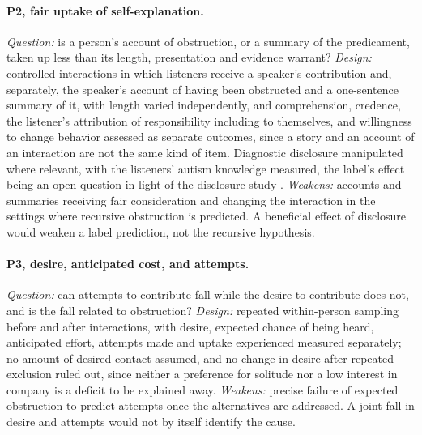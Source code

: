 \paragraph{P2, fair uptake of self-explanation.} \emph{Question:} is a person's account of obstruction, or a summary of the predicament, taken up less than its length, presentation and evidence warrant? \emph{Design:} controlled interactions in which listeners receive a speaker's contribution and, separately, the speaker's account of having been obstructed and a one-sentence summary of it, with length varied independently, and comprehension, credence, the listener's attribution of responsibility including to themselves, and willingness to change behavior assessed as separate outcomes, since a story and an account of an interaction are not the same kind of item. Diagnostic disclosure manipulated where relevant, with the listeners' autism knowledge measured, the label's effect being an open question in light of the disclosure study \cite{SassonMorrison2019}. \emph{Weakens:} accounts and summaries receiving fair consideration and changing the interaction in the settings where recursive obstruction is predicted. A beneficial effect of disclosure would weaken a label prediction, not the recursive hypothesis.

\paragraph{P3, desire, anticipated cost, and attempts.} \emph{Question:} can attempts to contribute fall while the desire to contribute does not, and is the fall related to obstruction? \emph{Design:} repeated within-person sampling before and after interactions, with desire, expected chance of being heard, anticipated effort, attempts made and uptake experienced measured separately; no amount of desired contact assumed, and no change in desire after repeated exclusion ruled out, since neither a preference for solitude nor a low interest in company is a deficit to be explained away. \emph{Weakens:} precise failure of expected obstruction to predict attempts once the alternatives are addressed. A joint fall in desire and attempts would not by itself identify the cause.

